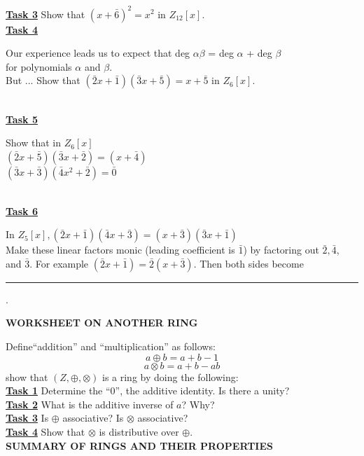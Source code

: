 \documentclass[12pt, fleqn, oneside]{book}
\begin{document}
\underline{\bf{Task 3}} Show that $(x+\bar{6})^2 = x^2$ in $Z_{12}[x]$.\\ \vfill
\underline{\bf{Task 4}} \parbox[t]{5in}{Our experience leads us to expect that deg $\alpha\beta$ = deg $\alpha$ + deg $\beta$\\[.2in] for polynomials $\alpha$ and $\beta$.\\[.2in]
But ... Show that $(\bar{2}x+\bar{1})(\bar{3}x+\bar{5})=x+\bar{5}$ in $Z_6[x]$.}\\ \vfill
%
%
\clearpage%
%
%
\underline{\bf{Task 5}} \parbox[t]{5in}{Show that in $Z_6[x]$\\[.2in]
$(\bar{2}x+\bar{5})(\bar{3}x+\bar{2}) = (x+\bar{4})$\\[1.25in]
$(\bar{3}x+\bar{3})(\bar{4}x^2+\bar{2}) = \bar{0}$\\[1.25in]}\\
\underline{\bf{Task 6}} \parbox[t]{5.5in}{In $Z_5[x], (\bar{2}x+\bar{1})(\bar{4}x+\bar{3})=(x+\bar{3})(\bar{3}x+\bar{1})$\\[1.5in]
Make these linear factors monic (leading coefficient is $\bar{1}$) by factoring out $\bar 2, \bar 4$,\\[.2in] and $\bar 3$.  For example $(\bar2 x+\bar 1)=\bar 2(x+\bar 3)$.  Then both sides become\\[.25in]
\rule{1.75in}{.01in}.}
%
%
%
\clearpage
%
%
%
{\large \bf 	WORKSHEET ON ANOTHER RING}\\[.25in]
Define``addition'' and ``multiplication'' as follows:
$$ a\oplus b = a+b-1 $$
$$ a\otimes b = a+b-ab$$
show that $(Z,\oplus, \otimes)$ is a ring by doing the following:\\[.25in]
\underline{\bf{Task 1}} Determine the ``0'', the additive identity.  Is there a unity?\\ \vfill
\underline{\bf{Task 2}} What is the additive inverse of $a$?  Why?\\ \vfill
\underline{\bf{Task 3}} Is $\oplus$ associative?  Is $\otimes$ associative?\\ \vfill
\underline{\bf{Task 4}} Show that $\otimes$ is distributive over $\oplus$.\\ \vfill
%
%
%
\clearpage
%
%
%
{\large \bf 	SUMMARY OF RINGS AND THEIR PROPERTIES}\\[.25in]
\end{document}
